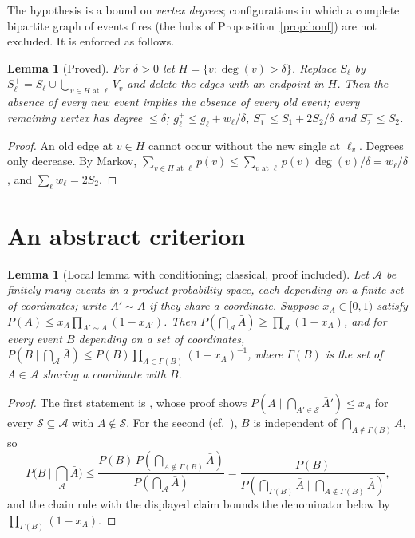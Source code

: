 \documentclass[11pt,reqno]{amsart}
\newtheorem{lemma}[theorem]{Lemma}
\theoremstyle{definition}
\begin{document}
The hypothesis is a bound on \emph{vertex degrees}; configurations in which a
complete bipartite graph of events fires (the hubs of
Proposition~\ref{prop:bonf}) are not excluded.  It is enforced as follows.

\begin{lemma}[Proved]\label{lem:hub}
For $\delta>0$ let $H=\{v:\deg(v)>\delta\}$.  Replace $S_\ell$ by
$S_\ell^+=S_\ell\cup\bigcup_{v\in H\text{ at }\ell}V_v$ and delete the edges with an
endpoint in $H$.  Then the absence of every new event implies the absence of
every old event; every remaining vertex has degree $\le\delta$;
$g_\ell^+\le g_\ell+w_\ell/\delta$, $S_1^+\le S_1+2S_2/\delta$ and $S_2^+\le S_2$.
\end{lemma}

\begin{proof}
An old edge at $v\in H$ cannot occur without the new single at $\ell_v$.
Degrees only decrease.  By Markov,
$\sum_{v\in H\text{ at }\ell}p(v)\le\sum_{v\text{ at }\ell}p(v)\deg(v)/\delta=w_\ell/\delta$,
and $\sum_\ell w_\ell=2S_2$.
\end{proof}

\section{An abstract criterion}\label{sec:crit}

\begin{lemma}[Local lemma with conditioning; classical, proof included]\label{lem:lll}
Let $\mathcal A$ be finitely many events in a product probability space, each
depending on a finite set of coordinates; write $A'\sim A$ if they share a
coordinate.  Suppose $x_A\in[0,1)$ satisfy
$P(A)\le x_A\prod_{A'\sim A}(1-x_{A'})$.  Then
$P(\bigcap_{\mathcal A}\bar A)\ge\prod_{\mathcal A}(1-x_A)$, and for every event $B$
depending on a set of coordinates,
$P(B\mid\bigcap_{\mathcal A}\bar A)\le P(B)\prod_{A\in\Gamma(B)}(1-x_A)^{-1}$, where
$\Gamma(B)$ is the set of $A\in\mathcal A$ sharing a coordinate with $B$.
\end{lemma}

\begin{proof}
The first statement is \cite[Lemma~5.1.1]{AS}, whose proof shows
$P(A\mid\bigcap_{A'\in\mathcal S}\bar A')\le x_A$ for every $\mathcal S\subseteq\mathcal A$
with $A\notin\mathcal S$.  For the second (cf.\ \cite[Thm.~2.1]{HSS}), $B$ is
independent of $\bigcap_{A\notin\Gamma(B)}\bar A$, so
\[
 P\Big(B\ \Big|\ \bigcap_{\mathcal A}\bar A\Big)
 \le\frac{P(B)\,P(\bigcap_{A\notin\Gamma(B)}\bar A)}{P(\bigcap_{\mathcal A}\bar A)}
 =\frac{P(B)}{P(\bigcap_{\Gamma(B)}\bar A\mid\bigcap_{A\notin\Gamma(B)}\bar A)},
\]
and the chain rule with the displayed claim bounds the denominator below by
$\prod_{\Gamma(B)}(1-x_A)$.
\end{proof}
\end{document}
